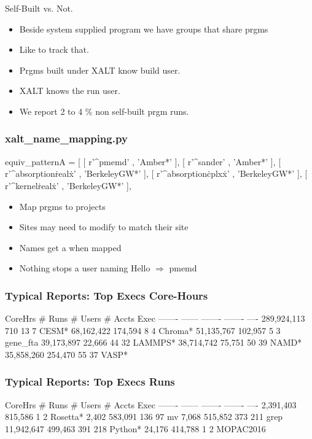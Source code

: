 \documentclass{beamer}
\begin{document}
\begin{frame}{Self-Built vs. Not.}
  \begin{itemize}
    \item Beside system supplied program we have groups that share prgms
    \item Like to track that.
    \item Prgms built under XALT know build user.
    \item XALT knows the run user.
    \item We report 2 to 4 \% non self-built prgm runs.
  \end{itemize}
\end{frame}

\begin{frame}[fragile]
    \frametitle{xalt\_name\_mapping.py}
 {\small
    \begin{semiverbatim}
equiv_patternA = [
    [ r'^pmemd'               , 'Amber*'      ],
    [ r'^sander'              , 'Amber*'      ],
    [ r'^absorption\.real\.x' , 'BerkeleyGW*' ],
    [ r'^absorption\.cplx\.x' , 'BerkeleyGW*' ],
    [ r'^kernel\.real\.x'     , 'BerkeleyGW*' ],
    \end{semiverbatim}
}
  \begin{itemize}
    \item Map prgms to projects
    \item Sites may need to modify to match their site
    \item Names get a \* when mapped
    \item Nothing stops a user naming Hello $\Rightarrow$ pmemd
  \end{itemize}

\end{frame}

\begin{frame}[fragile]
    \frametitle{Typical Reports: Top Execs Core-Hours}
 {\small
    \begin{semiverbatim}
    CoreHrs   # Runs  # Users  # Accts  Exec
    -------   ------  -------  -------  ----
289,924,113      710       13        7  CESM*
 68,162,422  174,594        8        4  Chroma*
 51,135,767  102,957        5        3  gene_fta
 39,173,897   22,666       44       32  LAMMPS*
 38,714,742   75,751       50       39  NAMD*
 35,858,260  254,470       55       37  VASP*
    \end{semiverbatim}
}
\end{frame}

\begin{frame}[fragile]
    \frametitle{Typical Reports: Top Execs Runs}
 {\small
    \begin{semiverbatim}
   CoreHrs   # Runs  # Users  # Accts  Exec
   -------   ------  -------  -------  ----
 2,391,403  815,586        1        2  Rosetta*
     2,402  583,091      136       97  mv
     7,068  515,852      373      211  grep
11,942,647  499,463      391      218  Python*
    24,176  414,788        1        2  MOPAC2016
    \end{semiverbatim}
}
\end{frame}
\end{document}

